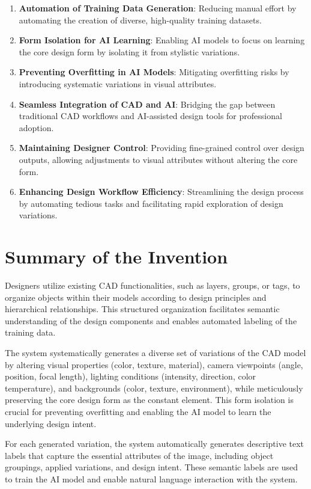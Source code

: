 \documentclass{article}
\begin{document}
\begin{enumerate}
    \item \textbf{Automation of Training Data Generation}: Reducing manual effort by automating the creation of diverse, high-quality training datasets.
    \item \textbf{Form Isolation for AI Learning}: Enabling AI models to focus on learning the core design form by isolating it from stylistic variations.
    \item \textbf{Preventing Overfitting in AI Models}: Mitigating overfitting risks by introducing systematic variations in visual attributes.
    \item \textbf{Seamless Integration of CAD and AI}: Bridging the gap between traditional CAD workflows and AI-assisted design tools for professional adoption.
    \item \textbf{Maintaining Designer Control}: Providing fine-grained control over design outputs, allowing adjustments to visual attributes without altering the core form.
    \item \textbf{Enhancing Design Workflow Efficiency}: Streamlining the design process by automating tedious tasks and facilitating rapid exploration of design variations.
\end{enumerate}

\section{Summary of the Invention}

Designers utilize existing CAD functionalities, such as layers, groups, or tags, to organize objects within their models according to design principles and hierarchical relationships. This structured organization facilitates semantic understanding of the design components and enables automated labeling of the training data.

The system systematically generates a diverse set of variations of the CAD model by altering visual properties (color, texture, material), camera viewpoints (angle, position, focal length), lighting conditions (intensity, direction, color temperature), and backgrounds (color, texture, environment), while meticulously preserving the core design form as the constant element. This form isolation is crucial for preventing overfitting and enabling the AI model to learn the underlying design intent.

For each generated variation, the system automatically generates descriptive text labels that capture the essential attributes of the image, including object groupings, applied variations, and design intent. These semantic labels are used to train the AI model and enable natural language interaction with the system.
\end{document}
